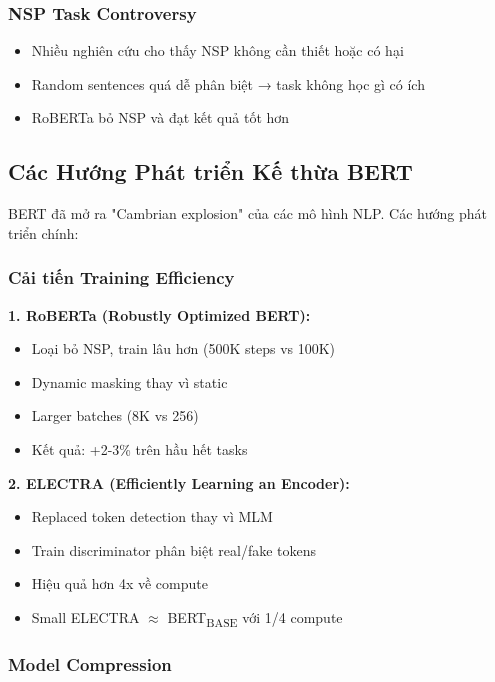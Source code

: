 \subsubsection{NSP Task Controversy}
\begin{itemize}
    \item Nhiều nghiên cứu cho thấy NSP không cần thiết hoặc có hại
    \item Random sentences quá dễ phân biệt → task không học gì có ích
    \item RoBERTa bỏ NSP và đạt kết quả tốt hơn
\end{itemize}

\subsection{Các Hướng Phát triển Kế thừa BERT}
\label{ssec:huong_phat_trien_ke_thua}
BERT đã mở ra "Cambrian explosion" của các mô hình NLP. Các hướng phát triển chính:

\subsubsection{Cải tiến Training Efficiency}

\textbf{1. RoBERTa (Robustly Optimized BERT):}
\begin{itemize}
    \item Loại bỏ NSP, train lâu hơn (500K steps vs 100K)
    \item Dynamic masking thay vì static
    \item Larger batches (8K vs 256)
    \item Kết quả: +2-3\% trên hầu hết tasks
\end{itemize}

\textbf{2. ELECTRA (Efficiently Learning an Encoder):}
\begin{itemize}
    \item Replaced token detection thay vì MLM
    \item Train discriminator phân biệt real/fake tokens
    \item Hiệu quả hơn 4x về compute
    \item Small ELECTRA $\approx$ BERT\textsubscript{BASE} với 1/4 compute
\end{itemize}

\subsubsection{Model Compression}

